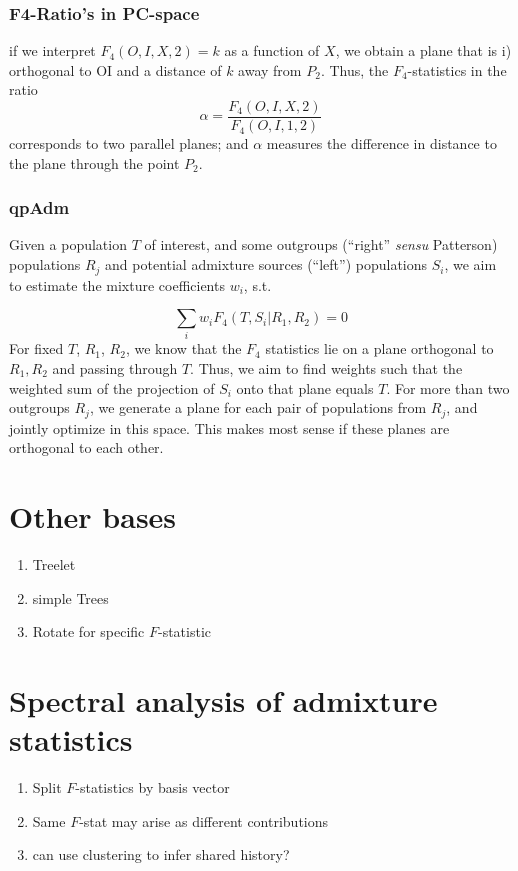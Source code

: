 \documentclass[9pt,twocolumn,twoside,lineno]{pnas-new}
\begin{document}
\subsubsection{F4-Ratio's in PC-space}
if we interpret $F_4(O,I,X,2)=k$ as a function of $X$, we obtain a plane that is i) orthogonal to OI and a distance of $k$ away from $P_2$. Thus, the $F_4$-statistics in the ratio
\begin{equation}
    \alpha = \frac{F_4(O,I,X,2)} {F_4(O,I,1,2)}
\end{equation}
corresponds to two parallel planes; and $\alpha$ measures the difference in distance to the plane through the point $P_2$.


\subsubsection{qpAdm}
Given a population $T$ of interest, and some outgroups (``right'' \textit{sensu} Patterson) populations $R_j$ and potential admixture sources (``left'') populations $S_i$, we aim to estimate the mixture coefficients $w_i$, s.t.

\begin{equation}
    \sum_i w_i F_4(T, S_i | R_1, R_2) = 0
\end{equation}
For fixed $T$, $R_1$, $R_2$, we know that the $F_4$ statistics lie on a plane orthogonal to $R_1, R_2$ and passing through $T$. Thus, we aim to find weights such that the weighted sum of the projection of $S_i$ onto that plane equals $T$. For more than two outgroups $R_j$, we generate a plane for each pair of populations from $R_j$, and jointly optimize in this space. This makes most sense if these planes are orthogonal to each other.



\section{Other bases}
\begin{enumerate}
    \item Treelet
    \item simple Trees
    \item Rotate for specific $F$-statistic
\end{enumerate}
\section{Spectral analysis of admixture statistics}
\begin{enumerate}
    \item Split $F$-statistics by basis vector
    \item Same $F$-stat may arise as different contributions
    \item can use clustering to infer shared history?
\end{enumerate}
\end{document}
